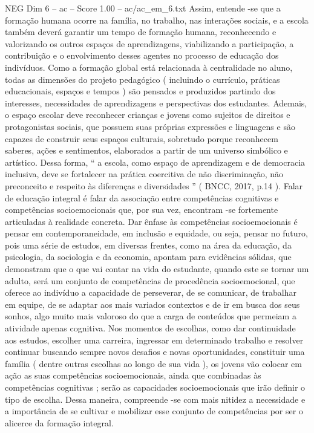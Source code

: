 \begin{textsample}{NEG Dim 6 – ac – Score 1.00 – ac/ac\_em\_6.txt}
Assim, entende -se que a formação humana ocorre na família, no trabalho, nas interações sociais, e a escola também deverá garantir um tempo de formação humana, reconhecendo e valorizando os outros espaços de aprendizagens, viabilizando a participação, a contribuição e o envolvimento desses agentes no processo de educação dos indivíduos.
Como a formação global está relacionada à centralidade no aluno, todas as dimensões do projeto pedagógico ( incluindo o currículo, práticas educacionais, espaços e tempos ) são pensados e produzidos partindo dos interesses, necessidades de aprendizagens e perspectivas dos estudantes.
Ademais, o espaço escolar deve reconhecer crianças e jovens como sujeitos de direitos e protagonistas sociais, que possuem suas próprias expressões e linguagens e são capazes de construir seus espaços culturais, sobretudo porque reconhecem saberes, ações e sentimentos, elaborados a partir de um universo simbólico e artístico.
Dessa forma, “ a escola, como espaço de aprendizagem e de democracia inclusiva, deve se fortalecer na prática coercitiva de não discriminação, não preconceito e respeito às diferenças e diversidades ” ( BNCC, 2017, p.14 ).
Falar de educação integral é falar da associação entre competências cognitivas e competências socioemocionais que, por sua vez, encontram -se fortemente articuladas à realidade concreta.
Dar ênfase às competências socioemocionais é pensar em contemporaneidade, em inclusão e equidade, ou seja, pensar no futuro, pois uma série de estudos, em diversas frentes, como na área da educação, da psicologia, da sociologia e da economia, apontam para evidências sólidas, que demonstram que o que vai contar na vida do estudante, quando este se tornar um adulto, será um conjunto de competências de procedência socioemocional, que oferece ao indivíduo a capacidade de perseverar, de se comunicar, de trabalhar em equipe, de se adaptar aos mais variados contextos e de ir em busca dos seus sonhos, algo muito mais valoroso do que a carga de conteúdos que permeiam a atividade apenas cognitiva.
Nos momentos de escolhas, como dar continuidade aos estudos, escolher uma carreira, ingressar em determinado trabalho e resolver continuar buscando sempre novos desafios e novas oportunidades, constituir uma família ( dentre outras escolhas ao longo de sua vida ), os jovens vão colocar em ação as suas competências socioemocionais, ainda que combinadas às competências cognitivas ; serão as capacidades socioemocionais que irão definir o tipo de escolha.
Dessa maneira, compreende -se com mais nitidez a necessidade e a importância de se cultivar e mobilizar esse conjunto de competências por ser o alicerce da formação integral.

\end{textsample}
